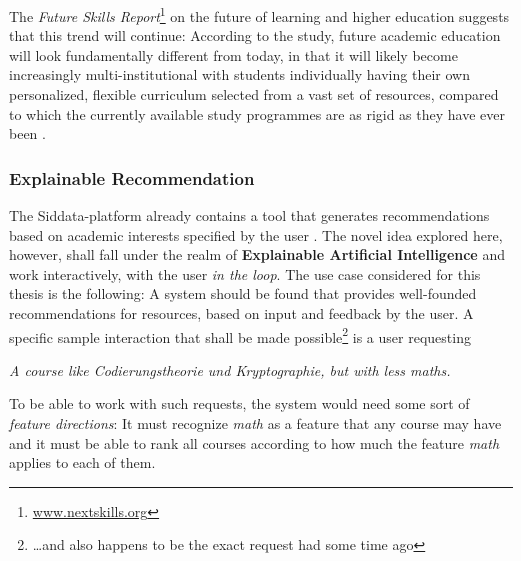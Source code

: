 The \emph{Future Skills Report}\footnote{\url{www.nextskills.org}} on the future of learning and higher education \cite{Ehlers2019} suggests that this trend will continue: According to the study, future academic education will look fundamentally different from today, in that it will likely become increasingly multi-institutional with students individually having their own personalized, flexible curriculum selected from a vast set of resources, compared to which the currently available study programmes are as rigid as they have ever been \cite{Ehlers2019}.

\subsubsection*{Explainable Recommendation}

The Siddata-platform already contains a tool that generates recommendations based on academic interests specified by the user \cite{Schurz2021}. The novel idea explored here, however, shall fall under the realm of \textbf{Explainable Artificial Intelligence} and work interactively, with the user \textit{in the loop}. The use case considered for this thesis is the following: A system should be found that provides well-founded recommendations for resources, based on input and feedback by the user. A specific sample interaction that shall be made possible\footnote{\dots and also happens to be the exact request \me had some time ago} is a user requesting 
\begin{displayquote}
    \textit{\guillemotright A course like \emph{Codierungstheorie und Kryptographie}, but with less maths.\guillemotleft}
\end{displayquote}

To be able to work with such requests, the system would need some sort of \textit{feature directions}: It must recognize \emph{math} as a feature that any course may have and it must be able to rank all courses according to how much the feature \emph{math} applies to each of them.


\label{sec:amazonalgo}

